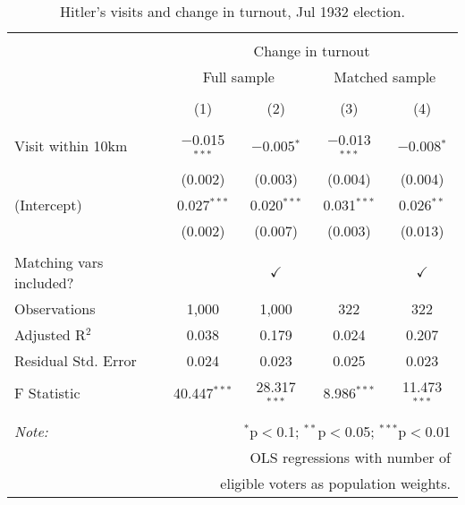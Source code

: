 
\begin{table}[!htbp] \centering 
  \caption{Hitler's visits and change in turnout, Jul 1932 election.} 
  \label{tab:ols-d_p_turnout-2} 
\begin{tabular}{@{\extracolsep{5pt}}lcccc} 
\\[-1.8ex]\hline 
\hline \\[-1.8ex] 
 & \multicolumn{4}{c}{Change in turnout} \\ 
\cline{2-5} 
 & \multicolumn{2}{c}{Full sample} & \multicolumn{2}{c}{Matched sample} \\ 
\\[-1.8ex] & (1) & (2) & (3) & (4)\\ 
\hline \\[-1.8ex] 
 Visit within 10km & $-$0.015$^{***}$ & $-$0.005$^{*}$ & $-$0.013$^{***}$ & $-$0.008$^{*}$ \\ 
  & (0.002) & (0.003) & (0.004) & (0.004) \\ 
  (Intercept) & 0.027$^{***}$ & 0.020$^{***}$ & 0.031$^{***}$ & 0.026$^{**}$ \\ 
  & (0.002) & (0.007) & (0.003) & (0.013) \\ 
 \hline \\[-1.8ex] 
Matching vars included? &  & \multicolumn{1}{c}{$\checkmark$} &  & \multicolumn{1}{c}{$\checkmark$} \\ 
Observations & 1,000 & 1,000 & 322 & 322 \\ 
Adjusted R$^{2}$ & 0.038 & 0.179 & 0.024 & 0.207 \\ 
Residual Std. Error & 0.024 & 0.023 & 0.025 & 0.023 \\ 
F Statistic & 40.447$^{***}$ & 28.317$^{***}$ & 8.986$^{***}$ & 11.473$^{***}$ \\ 
\hline 
\hline \\[-1.8ex] 
\textit{Note:}  & \multicolumn{4}{r}{$^{*}$p$<$0.1; $^{**}$p$<$0.05; $^{***}$p$<$0.01} \\ 
 & \multicolumn{4}{r}{OLS regressions with number of} \\ 
 & \multicolumn{4}{r}{eligible voters as population weights.} \\ 
\end{tabular} 
\end{table} 
